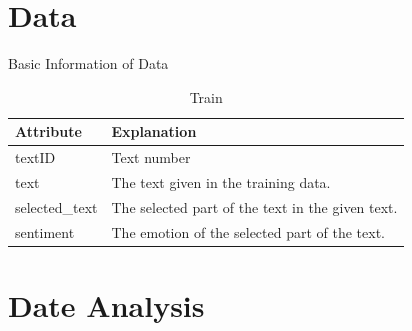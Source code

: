 \documentclass[
 size=14pt,
 paper=smartboard,  %
 mode=present, 		%
 display=slides, 	%
 style=tuliplab,  	%
 pauseslide,
 fleqn,leqno]{powerdot}
\begin{document}
\section{Data}


\begin{slide}[toc=,bm=]{Basic Information of Data}
  
  \begin{table}[htbp]
  
    \caption{Train}
  
    \begin{tabular}{p{100pt} p{200pt}}\toprule
      Attribute & Explanation \\
         \midrule
         textID
         & Text number \\
         text
         & The text given in the training data. \\
         selected_text
         & The selected part of the text in the given text.  \\
         sentiment
         & The emotion of the selected part of the text.  \\
        \bottomrule
   
    \end{tabular}
  
  \end{table}
  

  \bigskip

\end{slide}


\section{Date Analysis}
\end{document}
